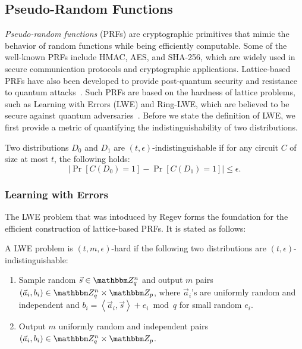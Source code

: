 \subsection{Pseudo-Random Functions}
\emph{Pseudo-random functions} (PRFs) are cryptographic primitives that mimic the behavior of random functions while being efficiently computable.
Some of the well-known PRFs include HMAC, AES, and SHA-256, which are widely used in secure communication protocols and cryptographic applications.
Lattice-based PRFs have also been developed to provide post-quantum security and resistance to quantum attacks~\cite{peikert2014lattice}.
Such PRFs are based on the hardness of lattice problems, such as Learning with Errors (LWE) and Ring-LWE, which are believed to be secure against quantum adversaries~\cite{regev2009lattices, lyubashevsky2013ideal}.
Before we state the definition of LWE, we first provide a metric of quantifying the indistinguishability of two distributions.

\begin{definition}
	Two distributions $D_0$ and $D_1$ are $(t, \epsilon)$-indistinguishable if for any circuit $C$ of size at most $t$, the following holds:
	\[\left|\Pr[C(D_0) = 1] - \Pr[C(D_1) = 1]\right| \leq \epsilon.\]	
\end{definition}

\subsubsection{Learning with Errors}
The LWE problem that was intoduced by Regev forms the foundation for the efficient construction of lattice-based PRFs.
It is stated as follows:

\begin{definition}
	A LWE problem is $(t, m, \epsilon)$-hard if the following two distributions are $(t, \epsilon)$-indistinguishable:
	\begin{enumerate}
		\item Sample random $\vec{s} \in \Z_q^n$ and output $m$ pairs $\left(\vec{a}_i, b_i\right) \in \Z_q^n \times \Z_p$, where $\vec{a}_i$'s are uniformly random and independent and $b_i = \left\langle \vec{a}_i, \vec{s}\right\rangle + e_i \bmod q$ for small random $e_i$.
		\item Output $m$ uniformly random and independent pairs $\left(\vec{a}_i, b_i\right) \in \Z_q^n \times \Z_p$.
	\end{enumerate}
\end{definition}


